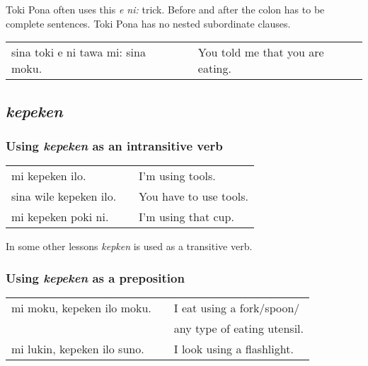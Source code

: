 Toki Pona often uses this \textit{e ni:} trick. 
Before and after the colon has to be complete sentences. 
Toki Pona has no nested subordinate clauses.

\begin{supertabular}{p{5,5cm}|ll}
sina toki e ni tawa mi: sina moku. && You told me that you are eating. \\
\end{supertabular} 

{}
\subsection*{\textit{kepeken}}
%
\subsubsection*{Using \textit{kepeken} as an intransitive verb}
 
\begin{supertabular}{p{5,5cm}|ll}
mi kepeken ilo. && I'm using tools. \\
sina wile kepeken ilo. && You have to use tools. \\
mi kepeken poki ni. && I'm using that cup. \\
\end{supertabular} 

In some other lessons \textit{kepken} is used as a transitive verb.
%
\subsubsection*{Using \textit{kepeken} as a preposition}
%
\begin{supertabular}{p{5,5cm}|ll}
mi moku, kepeken ilo moku. && I eat using a fork/spoon/ \\ && any type of eating utensil. \\
mi lukin, kepeken ilo suno. && I look using a flashlight.  \\
\end{supertabular} 

